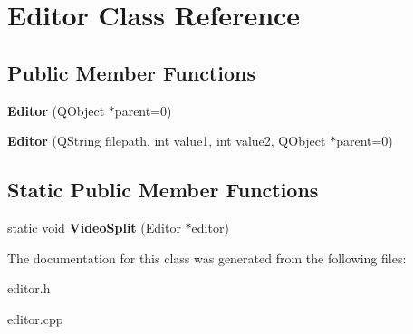 \hypertarget{class_editor}{\section{\-Editor \-Class \-Reference}
\label{class_editor}
}
\subsection*{\-Public \-Member \-Functions}
\begin{DoxyCompactItemize}
\item 
\hypertarget{class_editor_a8b3b1155b1d158f6a3adb26e5dc65df0}{{\bfseries \-Editor} (\-Q\-Object $\ast$parent=0)}\label{class_editor_a8b3b1155b1d158f6a3adb26e5dc65df0}

\item 
\hypertarget{class_editor_a01d9b2ad0d3d13199863f62ec9bcd368}{{\bfseries \-Editor} (\-Q\-String filepath, int value1, int value2, \-Q\-Object $\ast$parent=0)}\label{class_editor_a01d9b2ad0d3d13199863f62ec9bcd368}

\end{DoxyCompactItemize}
\subsection*{\-Static \-Public \-Member \-Functions}
\begin{DoxyCompactItemize}
\item 
\hypertarget{class_editor_ae98dbc8d28690f3f1b203d582cd4c95a}{static void {\bfseries \-Video\-Split} (\hyperlink{class_editor}{\-Editor} $\ast$editor)}\label{class_editor_ae98dbc8d28690f3f1b203d582cd4c95a}

\end{DoxyCompactItemize}


\-The documentation for this class was generated from the following files\-:\begin{DoxyCompactItemize}
\item 
editor.\-h\item 
editor.\-cpp\end{DoxyCompactItemize}
